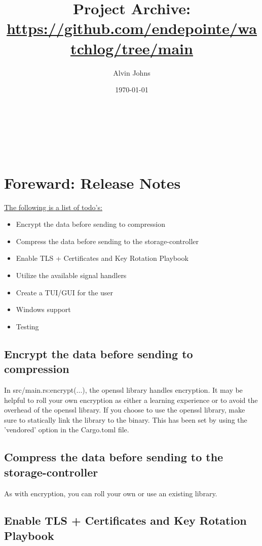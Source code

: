 \documentclass{article}
\title{Project Archive: \vspace{0.25cm} \\
\underline{\url{https://github.com/endepointe/watchlog/tree/main}}}
\author{Alvin Johns}
\date{\today}
\makeatletter
\renewcommand{\maketitle}{
    \begin{titlepage}
        \centering
        \vspace*{\fill}
        \large \textbf{\@title} \\
        \vspace{0.5cm}
        \normalsize \textbf{\@author}\\
        \vspace{0.5cm}
        \normalsize \textbf{\@date} \\
        \vspace*{\fill}
    \end{titlepage}
}
\makeatother
\begin{document}
\maketitle

\newpage

\tableofcontents

\newpage

\raggedright

\section{Foreward: Release Notes}

\underline{The following is a list of todo's:}

\begin{itemize}[label=+]
    \item{Encrypt the data before sending to compression}
    \item{Compress the data before sending to the storage-controller}
    \item{Enable TLS + Certificates and Key Rotation Playbook}
    \item{Utilize the available signal handlers}
    \item{Create a TUI/GUI for the user}
    \item{Windows support}
    \item{Testing}
\end{itemize}

\subsection{Encrypt the data before sending to compression}

In src/main.rs:encrypt(...), the openssl library handles encryption. It may be helpful to roll your own encryption as either a learning experience or to avoid the overhead of the openssl library. If you choose to use the openssl library, make sure to statically link the library to the binary. This has been set by using the 'vendored' option in the Cargo.toml file.

\subsection{Compress the data before sending to the storage-controller}

As with encryption, you can roll your own or use an existing library.

\subsection{Enable TLS + Certificates and Key Rotation Playbook}
\end{document}
